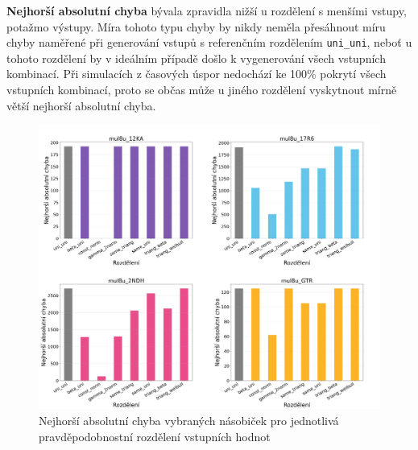 \textbf{Nejhorší absolutní chyba} bývala zpravidla nižší u rozdělení s menšími vstupy, potažmo výstupy. Míra tohoto typu chyby by nikdy neměla přesáhnout míru chyby naměřené při generování vstupů s referenčním rozdělením \texttt{uni\_uni}, neboť u tohoto rozdělení by v ideálním případě došlo k vygenerování všech vstupních kombinací. Při simulacích z časových úspor nedochází ke 100\% pokrytí všech vstupních kombinací, proto se občas může u jiného rozdělení vyskytnout mírně větší nejhorší absolutní chyba.

\begin{figure}[H]
    \centering
    \includegraphics[width=\textwidth]{obrazky-figures/metrics_worst_case_error.png}
    \caption{Nejhorší absolutní chyba vybraných násobiček pro jednotlivá pravděpodobnostní rozdělení vstupních hodnot}
    \label{fig:metrics_worst_case_error}
\end{figure}

